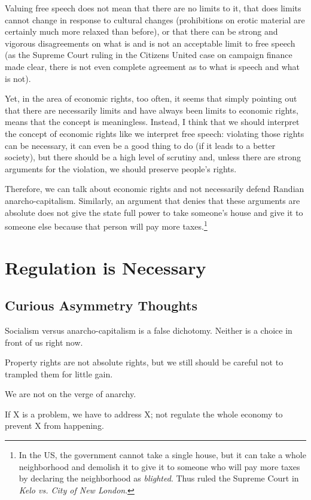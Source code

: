 Valuing free speech does not mean that there are no limits to it, that does
limits cannot change in response to cultural changes (prohibitions on erotic
material are certainly much more relaxed than before), or that there can be
strong and vigorous disagreements on what is and is not an acceptable limit to
free speech (as the Supreme Court ruling in the Citizens United case on
campaign finance made clear, there is not even complete agreement as to what is
speech and what is not).

Yet, in the area of economic rights, too often, it seems that simply pointing
out that there are necessarily limits and have always been limits to economic
rights, means that the concept is meaningless. Instead, I think that we should
interpret the concept of economic rights like we interpret free speech:
violating those rights can be necessary, it can even be a good thing to do (if
it leads to a better society), but there should be a high level of scrutiny
and, unless there are strong arguments for the violation, we should preserve
people's rights.

Therefore, we can talk about economic rights and not necessarily defend Randian
anarcho-capitalism. Similarly, an argument that denies that these arguments are
absolute does not give the state full power to take someone's house and give it
to someone else because that person will pay more taxes.\footnote{In the US,
the government cannot take a single house, but it can take a whole neighborhood
and demolish it to give it to someone who will pay more taxes by declaring the
neighborhood as \emph{blighted}. Thus ruled the Supreme Court in \emph{Kelo vs.
City of New London}.}

\section{Regulation is Necessary}

\subsection{Curious Asymmetry Thoughts}

\thought Socialism versus anarcho-capitalism is a false dichotomy. Neither is a
choice in front of us right now.

\thought Property rights are not absolute rights, but we still should be
careful not to trampled them for little gain.

\thought We are not on the verge of anarchy.

\thought If X is a problem, we have to address X; not regulate the whole
economy to prevent X from happening.

